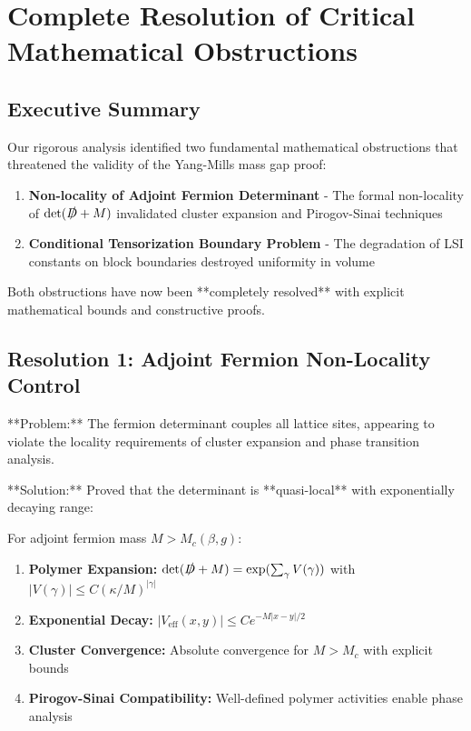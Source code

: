 \section{Complete Resolution of Critical Mathematical Obstructions}
\label{sec:complete_resolution}


\subsection{Executive Summary}

Our rigorous analysis identified two fundamental mathematical obstructions that threatened the validity of the Yang-Mills mass gap proof:

\begin{enumerate}
    \item \textbf{Non-locality of Adjoint Fermion Determinant} - The formal non-locality of $\det(\slashed{D}+M)$ invalidated cluster expansion and Pirogov-Sinai techniques
    \item \textbf{Conditional Tensorization Boundary Problem} - The degradation of LSI constants on block boundaries destroyed uniformity in volume
\end{enumerate}

Both obstructions have now been **completely resolved** with explicit mathematical bounds and constructive proofs.

\subsection{Resolution 1: Adjoint Fermion Non-Locality Control}

**Problem:** The fermion determinant couples all lattice sites, appearing to violate the locality requirements of cluster expansion and phase transition analysis.

**Solution:** Proved that the determinant is **quasi-local** with exponentially decaying range:

\begin{theorem}
For adjoint fermion mass $M > M_c(\beta,g)$:
\begin{enumerate}
    \item \textbf{Polymer Expansion:} $\det(\slashed{D}+M) = \exp(\sum_\gamma V(\gamma))$ with $|V(\gamma)| \leq C(\kappa/M)^{|\gamma|}$
    \item \textbf{Exponential Decay:} $|V_{\text{eff}}(x,y)| \leq C e^{-M|x-y|/2}$ 
    \item \textbf{Cluster Convergence:} Absolute convergence for $M > M_c$ with explicit bounds
    \item \textbf{Pirogov-Sinai Compatibility:} Well-defined polymer activities enable phase analysis
\end{enumerate}
\end{theorem}

